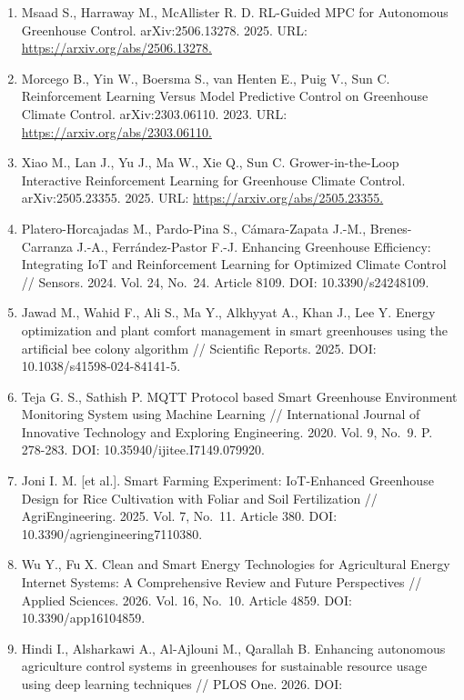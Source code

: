\documentclass[a4paper,14pt]{extarticle}
\begin{document}
\begin{enumerate}
  climate control // Smart Agricultural Technology. 2025. Vol. 10.
  Article 100751. DOI: 10.1016/j.atech.2024.100751.
\item
  Msaad S., Harraway M., McAllister R. D. RL-Guided MPC for Autonomous
  Greenhouse Control. arXiv:2506.13278. 2025. URL:
  \url{https://arxiv.org/abs/2506.13278.}
\item
  Morcego B., Yin W., Boersma S., van Henten E., Puig V., Sun C.
  Reinforcement Learning Versus Model Predictive Control on Greenhouse
  Climate Control. arXiv:2303.06110. 2023. URL:
  \url{https://arxiv.org/abs/2303.06110.}
\item
  Xiao M., Lan J., Yu J., Ma W., Xie Q., Sun C. Grower-in-the-Loop
  Interactive Reinforcement Learning for Greenhouse Climate Control.
  arXiv:2505.23355. 2025. URL: \url{https://arxiv.org/abs/2505.23355.}
\item
  Platero-Horcajadas M., Pardo-Pina S., Cámara-Zapata J.-M.,
  Brenes-Carranza J.-A., Ferrández-Pastor F.-J. Enhancing Greenhouse
  Efficiency: Integrating IoT and Reinforcement Learning for Optimized
  Climate Control // Sensors. 2024. Vol. 24, No.~24. Article 8109. DOI:
  10.3390/s24248109.
\item
  Jawad M., Wahid F., Ali S., Ma Y., Alkhyyat A., Khan J., Lee Y. Energy
  optimization and plant comfort management in smart greenhouses using
  the artificial bee colony algorithm // Scientific Reports. 2025. DOI:
  10.1038/s41598-024-84141-5.
\item
  Teja G. S., Sathish P. MQTT Protocol based Smart Greenhouse
  Environment Monitoring System using Machine Learning // International
  Journal of Innovative Technology and Exploring Engineering. 2020. Vol.
  9, No.~9. P. 278-283. DOI: 10.35940/ijitee.I7149.079920.
\item
  Joni I. M. {[}et al.{]}. Smart Farming Experiment: IoT-Enhanced
  Greenhouse Design for Rice Cultivation with Foliar and Soil
  Fertilization // AgriEngineering. 2025. Vol. 7, No.~11. Article 380.
  DOI: 10.3390/agriengineering7110380.
\item
  Wu Y., Fu X. Clean and Smart Energy Technologies for Agricultural
  Energy Internet Systems: A Comprehensive Review and Future
  Perspectives // Applied Sciences. 2026. Vol. 16, No.~10. Article 4859.
  DOI: 10.3390/app16104859.
\item
  Hindi I., Alsharkawi A., Al-Ajlouni M., Qarallah B. Enhancing
  autonomous agriculture control systems in greenhouses for sustainable
  resource usage using deep learning techniques // PLOS One. 2026. DOI:

\end{enumerate}
\end{document}
